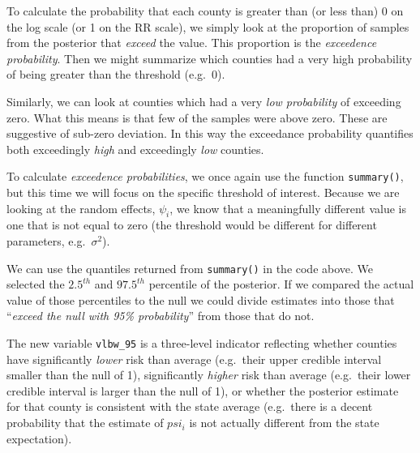 \documentclass[
]{book}
\newenvironment{Shaded}{\begin{snugshade}}{\end{snugshade}}
\newcommand{\CommentTok}[1]{\textcolor[rgb]{0.56,0.35,0.01}{\textit{#1}}}
\newcommand{\ConstantTok}[1]{\textcolor[rgb]{0.00,0.00,0.00}{#1}}
\newcommand{\DecValTok}[1]{\textcolor[rgb]{0.00,0.00,0.81}{#1}}
\newcommand{\FunctionTok}[1]{\textcolor[rgb]{0.00,0.00,0.00}{#1}}
\newcommand{\NormalTok}[1]{#1}
\newcommand{\OtherTok}[1]{\textcolor[rgb]{0.56,0.35,0.01}{#1}}
\newcommand{\SpecialCharTok}[1]{\textcolor[rgb]{0.00,0.00,0.00}{#1}}
\newcommand{\StringTok}[1]{\textcolor[rgb]{0.31,0.60,0.02}{#1}}
\begin{document}
To calculate the probability that each county is greater than (or less than) 0 on the log scale (or 1 on the RR scale), we simply look at the proportion of samples from the posterior that \emph{exceed} the value. This proportion is the \emph{exceedence probability}. Then we might summarize which counties had a very high probability of being greater than the threshold (e.g.~0).

Similarly, we can look at counties which had a very \emph{low probability} of exceeding zero. What this means is that few of the samples were above zero. These are suggestive of sub-zero deviation. In this way the exceedance probability quantifies both exceedingly \emph{high} and exceedingly \emph{low} counties.

To calculate \emph{exceedence probabilities}, we once again use the function \texttt{summary()}, but this time we will focus on the specific threshold of interest. Because we are looking at the random effects, \(\psi_i\), we know that a meaningfully different value is one that is not equal to zero (the threshold would be different for different parameters, e.g.~\(\sigma^2\)).

We can use the quantiles returned from \texttt{summary()} in the code above. We selected the \(2.5^{th}\) and \(97.5^{th}\) percentile of the posterior. If we compared the actual value of those percentiles to the null we could divide estimates into those that ``\emph{exceed the null with 95\% probability}'' from those that do not.

\begin{Shaded}
\end{Shaded}

The new variable \texttt{vlbw\_95} is a three-level indicator reflecting whether counties have significantly \emph{lower} risk than average (e.g.~their upper credible interval smaller than the null of 1), significantly \emph{higher} risk than average (e.g.~their lower credible interval is larger than the null of 1), or whether the posterior estimate for that county is consistent with the state average (e.g.~there is a decent probability that the estimate of \(psi_i\) is not actually different from the state expectation).
\end{document}
